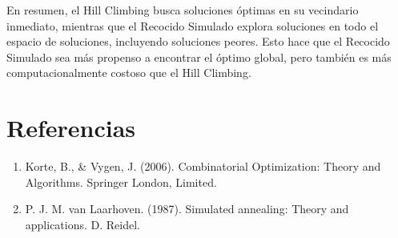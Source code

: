 \documentclass{article}
\begin{document}
En resumen, el Hill Climbing busca soluciones óptimas en su vecindario inmediato, mientras que el Recocido Simulado explora soluciones en todo el espacio de soluciones, incluyendo soluciones peores. Esto hace que el Recocido Simulado sea más propenso a encontrar el óptimo global, pero también es más computacionalmente costoso que el Hill Climbing.


\newpage
\section*{Referencias}
\begin{enumerate}
	\item Korte, B., \& Vygen, J. (2006). Combinatorial Optimization: Theory and Algorithms. Springer London, Limited.
	\item P. J. M. van Laarhoven. (1987). Simulated annealing: Theory and applications. D. Reidel.
\end{enumerate}
\end{document}
